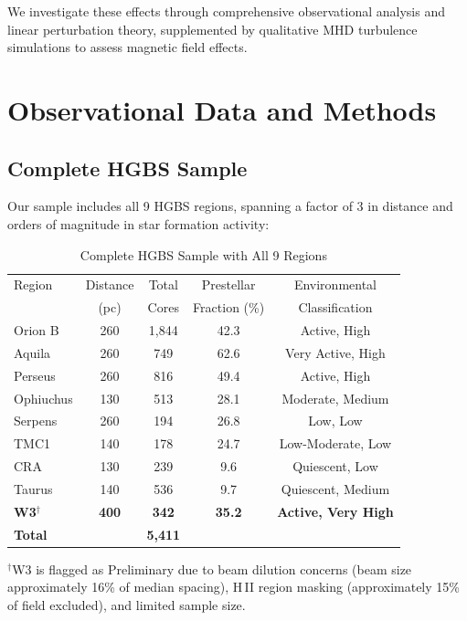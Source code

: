 \documentclass[11pt,a4paper]{article}
\begin{document}
We investigate these effects through comprehensive observational analysis and linear perturbation theory, supplemented by qualitative MHD turbulence simulations to assess magnetic field effects.

\section{Observational Data and Methods}

\subsection{Complete HGBS Sample}

Our sample includes all 9 HGBS regions, spanning a factor of 3 in distance and orders of magnitude in star formation activity:

\begin{table}[H]
\centering
\caption{Complete HGBS Sample with All 9 Regions}
\label{tab:sample_overview}
\begin{tabular}{lcccc}
\toprule
Region & Distance & Total & Prestellar & Environmental \\
       & (pc)   & Cores & Fraction (\%) & Classification \\
\midrule
Orion B  & 260     & 1,844 & 42.3     & Active, High \\
Aquila   & 260     & 749   & 62.6     & Very Active, High \\
Perseus  & 260     & 816   & 49.4     & Active, High \\
Ophiuchus& 130     & 513   & 28.1     & Moderate, Medium \\
Serpens  & 260     & 194   & 26.8     & Low, Low \\
TMC1     & 140     & 178   & 24.7     & Low-Moderate, Low \\
CRA      & 130     & 239   & 9.6      & Quiescent, Low \\
Taurus   & 140     & 536   & 9.7      & Quiescent, Medium \\
\textbf{W3}$^{\dagger}$      & \textbf{400}     & \textbf{342}   & \textbf{35.2}     & \textbf{Active, Very High} \\
\midrule
\textbf{Total} &        & \textbf{5,411} &        &  \\
\bottomrule
\end{tabular}
\vspace{-0.5em}
\small{$^{\dagger}$W3 is flagged as Preliminary due to beam dilution concerns (beam size approximately 16\% of median spacing), H\,{\scriptsize II} region masking (approximately 15\% of field excluded), and limited sample size.}
\end{table}
\end{document}
